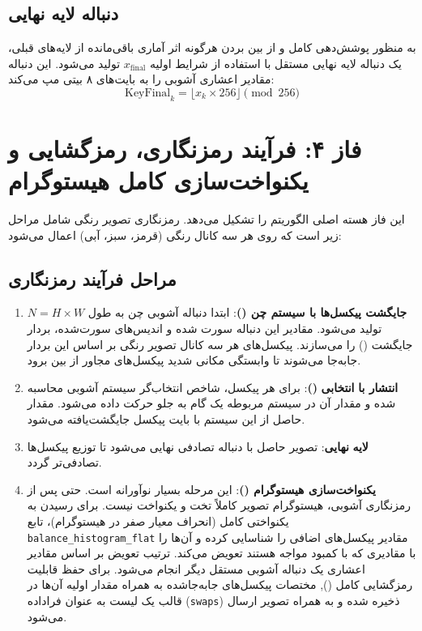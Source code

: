 \subsection{دنباله لایه  نهایی}
به منظور پوشش‌دهی کامل و از بین بردن هرگونه اثر آماری باقی‌مانده از لایه‌های قبلی، یک دنباله لایه  نهایی مستقل با استفاده از شرایط اولیه $x_{\mathrm{final}}$ تولید می‌شود. این دنباله مقادیر اعشاری آشوبی را به بایت‌های ۸ بیتی مپ می‌کند:
\begin{equation}
\mathrm{KeyFinal}_k = \lfloor x_k \times 256 \rfloor \pmod{256}
\end{equation}

\section{فاز ۴: فرآیند رمزنگاری، رمزگشایی و یکنواخت‌سازی کامل هیستوگرام}
این فاز هسته اصلی الگوریتم را تشکیل می‌دهد. رمزنگاری تصویر رنگی شامل مراحل زیر است که روی هر سه کانال رنگی (قرمز، سبز، آبی) اعمال می‌شود:

\subsection{مراحل فرآیند رمزنگاری}
\begin{enumerate}
    \item \textbf{جایگشت پیکسل‌ها با سیستم چن ()}:
    ابتدا دنباله آشوبی چن به طول $N = H \times W$ تولید می‌شود. مقادیر این دنباله سورت شده و اندیس‌های سورت‌شده، بردار جایگشت () را می‌سازند. پیکسل‌های هر سه کانال تصویر رنگی بر اساس این بردار جابه‌جا می‌شوند تا وابستگی مکانی شدید پیکسل‌های مجاور از بین برود.
    \item \textbf{انتشار با}  \textbf{انتخابی}  \textbf{()}:
    برای هر پیکسل، شاخص انتخاب‌گر سیستم آشوبی محاسبه شده و مقدار آن در سیستم  مربوطه یک گام به جلو حرکت داده می‌شود. مقدار حاصل از این سیستم با بایت پیکسل جایگشت‌یافته  می‌شود.
    \item \textbf{لایه}  \textbf{نهایی}:
    تصویر حاصل با دنباله تصادفی نهایی  می‌شود تا توزیع پیکسل‌ها تصادفی‌تر گردد.
    \item \textbf{یکنواخت‌سازی هیستوگرام ()}:
    این مرحله بسیار نوآورانه است. حتی پس از رمزنگاری آشوبی، هیستوگرام تصویر کاملاً تخت و یکنواخت نیست. برای رسیدن به یکنواختی کامل (انحراف معیار صفر در هیستوگرام)، تابع \texttt{balance\_histogram\_flat} مقادیر پیکسل‌های اضافی را شناسایی کرده و آن‌ها را با مقادیری که با کمبود مواجه هستند تعویض می‌کند. ترتیب تعویض بر اساس مقادیر اعشاری یک دنباله آشوبی مستقل دیگر انجام می‌شود. برای حفظ قابلیت رمزگشایی کامل (), مختصات پیکسل‌های جابه‌جاشده به همراه مقدار اولیه آن‌ها در قالب یک لیست به عنوان فراداده (\texttt{swaps}) ذخیره شده و به همراه تصویر ارسال می‌شود.
\end{enumerate}

